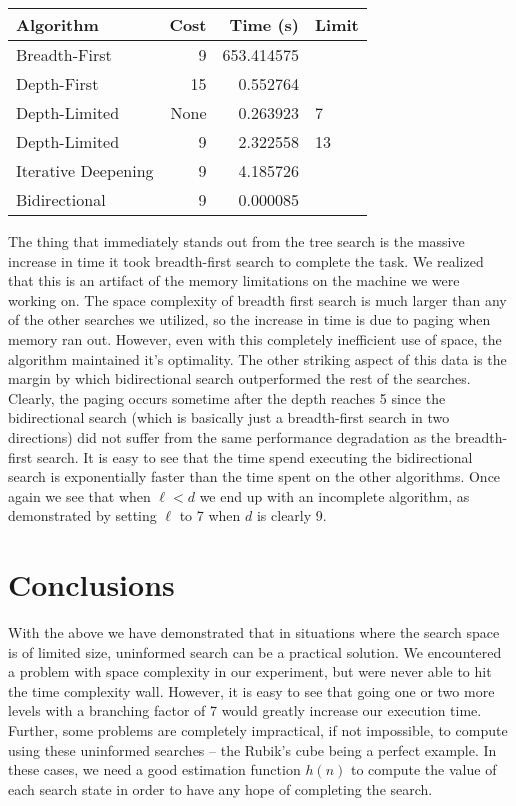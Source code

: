 \documentclass[a4paper,11pt]{report}
\begin{document}
\begin{tabular}{ | l | r | r | l | }
  \hline
  Algorithm & Cost & Time (s) & Limit \\ \hline
  Breadth-First & 9 & 653.414575 & \\
  Depth-First & 15 & 0.552764 & \\
  Depth-Limited & None & 0.263923 &  7 \\
  Depth-Limited & 9 & 2.322558 & 13 \\
  Iterative Deepening & 9 & 4.185726 & \\
  Bidirectional & 9 & 0.000085 & \\
  \hline
\end{tabular}
\vspace{5 mm}

The thing that immediately stands out from the tree search is the massive
increase in time it took breadth-first search to complete the task. We realized
that this is an artifact of the memory limitations on the machine we were
working on.  The space complexity of breadth first search is much larger than
any of the other searches we utilized, so the increase in time is due to paging
when memory ran out.  However, even with this completely inefficient use of
space, the algorithm maintained it's optimality.\newline
\indent The other striking aspect of this data is the margin by which
bidirectional search outperformed the rest of the searches. Clearly, the paging
occurs sometime after the depth reaches 5 since the bidirectional search (which
is basically just a breadth-first search in two directions) did not suffer from
the same performance degradation as the breadth-first search.  It is easy to see
that the time spend executing the bidirectional search is exponentially faster
than the time spent on the other algorithms.\newline
\indent Once again we see that when $\ell < d$ we end up with an incomplete
algorithm, as demonstrated by setting $\ell$ to 7 when $d$ is clearly 9.

\section{Conclusions}
With the above we have demonstrated that in situations where the search space is
of limited size, uninformed search can be a practical solution.  We encountered
a problem with space complexity in our experiment, but were never able to hit
the time complexity wall.  However, it is easy to see that going one or two more
levels with a branching factor of 7 would greatly increase our execution time.
Further, some problems are completely impractical, if not impossible, to compute
using these uninformed searches -- the Rubik's cube being a perfect example.  In
these cases, we need a good estimation function $h(n)$ to compute the value of
each search state in order to have any hope of completing the search.
\end{document}
